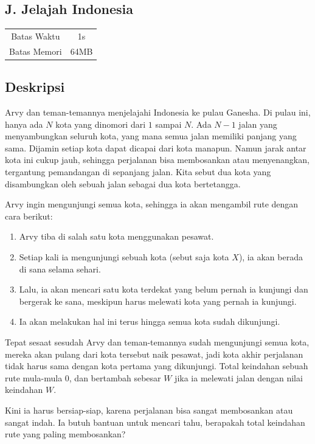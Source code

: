 \documentclass{article}
\begin{document}
\begin{center}
    \section*{J. Jelajah Indonesia}

    \begin{tabular}{ | c c | }
        \hline
        Batas Waktu  & 1s \\
        Batas Memori & 64MB \\
        \hline
    \end{tabular}
\end{center}

\subsection*{Deskripsi}

Arvy dan teman-temannya menjelajahi Indonesia ke pulau Ganesha.
Di pulau ini, hanya ada $N$ kota yang dinomori dari $1$ sampai $N$.
Ada $N - 1$ jalan yang menyambungkan seluruh kota, yang mana semua jalan memiliki panjang yang sama.
Dijamin setiap kota dapat dicapai dari kota manapun.
Namun jarak antar kota ini cukup jauh, sehingga perjalanan bisa membosankan atau menyenangkan, tergantung pemandangan di sepanjang jalan.
Kita sebut dua kota yang disambungkan oleh sebuah jalan sebagai dua kota bertetangga.

Arvy ingin mengunjungi semua kota, sehingga ia akan mengambil rute dengan cara berikut:
\begin{enumerate}
    \item Arvy tiba di salah satu kota menggunakan pesawat.
    \item Setiap kali ia mengunjungi sebuah kota (sebut saja kota $X$), ia akan berada di sana selama sehari.
    \item Lalu, ia akan mencari satu kota terdekat yang belum pernah ia kunjungi dan bergerak ke sana, meskipun harus melewati kota yang pernah ia kunjungi.
    \item Ia akan melakukan hal ini terus hingga semua kota sudah dikunjungi.
\end{enumerate}
Tepat sesaat sesudah Arvy dan teman-temannya sudah mengunjungi semua kota, mereka akan pulang dari kota tersebut naik pesawat, jadi kota akhir perjalanan tidak harus sama dengan kota pertama yang dikunjungi.
Total keindahan sebuah rute mula-mula 0, dan bertambah sebesar $W$ jika ia melewati jalan dengan nilai keindahan $W$.

Kini ia harus bersiap-siap, karena perjalanan bisa sangat membosankan atau sangat indah.
Ia butuh bantuan untuk mencari tahu, berapakah total keindahan rute yang paling membosankan?
\end{document}
